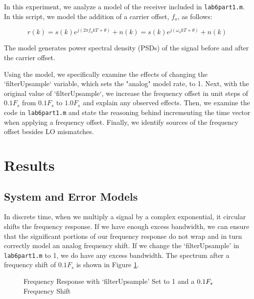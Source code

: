 \documentclass{article}
\begin{document}
In this experiment, we analyze a model of the receiver included in \texttt{lab6part1.m}. In this script, we model the addition of a carrier offset, $f_o$, as follows:

\begin{equation}
	r(k) = s(k)e^{j(2{\pi}f_okT+\theta)}+n(k) = s(k)e^{j(\omega_okT+\theta)}+n(k)
\end{equation}

\noindent The model generates power spectral density (PSDs) of the signal before and after the carrier offset.

Using the model, we specifically examine the effects of changing the `filterUpsample` variable, which sets the "analog" model rate, to 1. Next, with the original value of `filterUpsample`, we increase the frequency offset in unit steps of $0.1F_s$ from $0.1F_s$ to $1.0F_s$ and explain any observed effects. Then, we examine the code in \texttt{lab6part1.m} and state the reasoning behind incrementing the time vector when applying a frequency offset. Finally, we identify sources of the frequency offset besides LO mismatches.



\section{Results}

\subsection{System and Error Models}

In discrete time, when we multiply a signal by a complex exponential, it circular shifts the frequency response. If we have enough excess bandwidth, we can ensure that the significant portions of our frequency response do not wrap and in turn correctly model an analog frequency shift. If we change the `filterUpsample' in \texttt{lab6part1.m} to 1, we do have any excess bandwidth. The spectrum after a frequency shift of $0.1F_s$ is shown in Figure \ref{fig::psd_upsample_1}.

\begin{figure}[H]
	\centerline{}
	\caption{Frequency Response with `filterUpsample' Set to 1 and a $\protect{0.1F_s}$ Frequency Shift}
	\label{fig::psd_upsample_1}
\end{figure}
\end{document}

